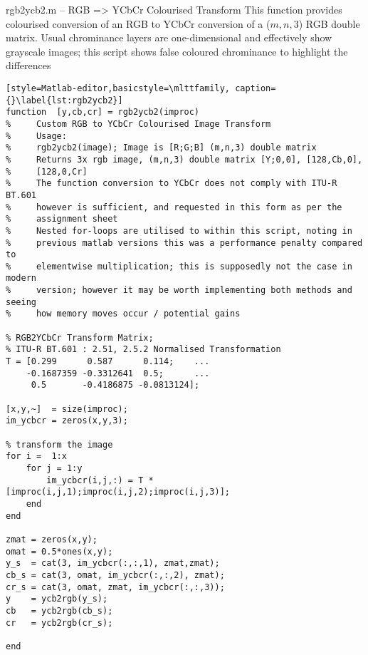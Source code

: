 \begin{codeblock}{rgb2ycb2.m -- RGB => YCbCr Colourised Transform}
    This function provides colourised conversion of an RGB to YCbCr conversion of a ($m,n,3$) RGB double matrix.
    Usual chrominance layers are one-dimensional and effectively show grayscale images; this script shows  false coloured chrominance to highlight the differences
        
    \begin{lstlisting}[style=Matlab-editor,basicstyle=\mlttfamily, caption={}\label{lst:rgb2ycb2}]
function  [y,cb,cr] = rgb2ycb2(improc)
%     Custom RGB to YCbCr Colourised Image Transform
%     Usage:
%     rgb2ycb2(image); Image is [R;G;B] (m,n,3) double matrix
%     Returns 3x rgb image, (m,n,3) double matrix [Y;0,0], [128,Cb,0], 
%     [128,0,Cr]
%     The function conversion to YCbCr does not comply with ITU-R BT.601
%     however is sufficient, and requested in this form as per the 
%     assignment sheet
%     Nested for-loops are utilised to within this script, noting in 
%     previous matlab versions this was a performance penalty compared to 
%     elementwise multiplication; this is supposedly not the case in modern
%     version; however it may be worth implementing both methods and seeing
%     how memory moves occur / potential gains

% RGB2YCbCr Transform Matrix;
% ITU-R BT.601 : 2.51, 2.5.2 Normalised Transformation 
T = [0.299      0.587      0.114;    ...
    -0.1687359 -0.3312641  0.5;      ...
     0.5       -0.4186875 -0.0813124]; 

[x,y,~]  = size(improc);
im_ycbcr = zeros(x,y,3);

% transform the image
for i =  1:x
    for j = 1:y
        im_ycbcr(i,j,:) = T * [improc(i,j,1);improc(i,j,2);improc(i,j,3)];
    end
end

zmat = zeros(x,y);
omat = 0.5*ones(x,y);
y_s  = cat(3, im_ycbcr(:,:,1), zmat,zmat);
cb_s = cat(3, omat, im_ycbcr(:,:,2), zmat);
cr_s = cat(3, omat, zmat, im_ycbcr(:,:,3));
y    = ycb2rgb(y_s);
cb   = ycb2rgb(cb_s);
cr   = ycb2rgb(cr_s);

end

\end{lstlisting}
\end{codeblock}



